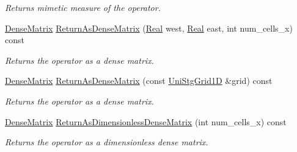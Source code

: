 \begin{DoxyCompactItemize}
\begin{DoxyCompactList}\small\item\em Returns mimetic measure of the operator. \end{DoxyCompactList}\item 
\hyperlink{classmtk_1_1DenseMatrix}{Dense\+Matrix} \hyperlink{classmtk_1_1Grad1D_a77b2eddbe4ab03f469306c604d505b1a}{Return\+As\+Dense\+Matrix} (\hyperlink{group__c01-roots_gac080bbbf5cbb5502c9f00405f894857d}{Real} west, \hyperlink{group__c01-roots_gac080bbbf5cbb5502c9f00405f894857d}{Real} east, int num\+\_\+cells\+\_\+x) const 
\begin{DoxyCompactList}\small\item\em Returns the operator as a dense matrix. \end{DoxyCompactList}\item 
\hyperlink{classmtk_1_1DenseMatrix}{Dense\+Matrix} \hyperlink{classmtk_1_1Grad1D_a871a3b31e257b04d5e303b3211df3a73}{Return\+As\+Dense\+Matrix} (const \hyperlink{classmtk_1_1UniStgGrid1D}{Uni\+Stg\+Grid1\+D} \&grid) const 
\begin{DoxyCompactList}\small\item\em Returns the operator as a dense matrix. \end{DoxyCompactList}\item 
\hyperlink{classmtk_1_1DenseMatrix}{Dense\+Matrix} \hyperlink{classmtk_1_1Grad1D_ab07e6a15edca32534ae3d1a8ccaf1c42}{Return\+As\+Dimensionless\+Dense\+Matrix} (int num\+\_\+cells\+\_\+x) const 
\begin{DoxyCompactList}\small\item\em Returns the operator as a dimensionless dense matrix. \end{DoxyCompactList}\end{DoxyCompactItemize}
